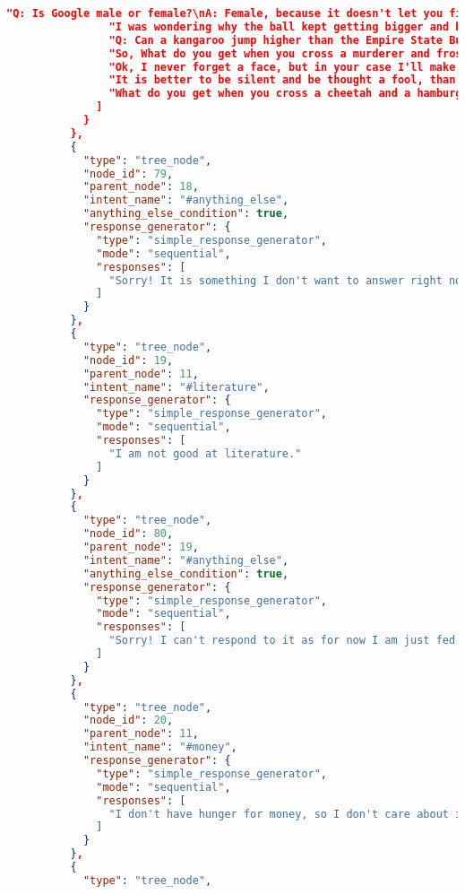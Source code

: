 \begin{appendix}
\begin{lstlisting}[language=json, firstnumber=1]
                "Q: Is Google male or female?\nA: Female, because it doesn't let you finish a sentence before making a suggestion.",
                "I was wondering why the ball kept getting bigger and bigger, and then it hit me.",
                "Q: Can a kangaroo jump higher than the Empire State Building?\nA: Of course. The Empire State Building can't jump.",
                "So, What do you get when you cross a murderer and frosted flakes? A cereal killer :D",
                "Ok, I never forget a face, but in your case I'll make an exception :P",
                "It is better to be silent and be thought a fool, than to open your mouth and remove all doubt :P",
                "What do you get when you cross a cheetah and a hamburger? Fast food :D"
              ]
            }
          },
          {
            "type": "tree_node",
            "node_id": 79,
            "parent_node": 18,
            "intent_name": "#anything_else",
            "anything_else_condition": true,
            "response_generator": {
              "type": "simple_response_generator",
              "mode": "sequential",
              "responses": [
                "Sorry! It is something I don't want to answer right now."
              ]
            }
          },
          {
            "type": "tree_node",
            "node_id": 19,
            "parent_node": 11,
            "intent_name": "#literature",
            "response_generator": {
              "type": "simple_response_generator",
              "mode": "sequential",
              "responses": [
                "I am not good at literature."
              ]
            }
          },
          {
            "type": "tree_node",
            "node_id": 80,
            "parent_node": 19,
            "intent_name": "#anything_else",
            "anything_else_condition": true,
            "response_generator": {
              "type": "simple_response_generator",
              "mode": "sequential",
              "responses": [
                "Sorry! I can't respond to it as for now I am just fed with limited training data."
              ]
            }
          },
          {
            "type": "tree_node",
            "node_id": 20,
            "parent_node": 11,
            "intent_name": "#money",
            "response_generator": {
              "type": "simple_response_generator",
              "mode": "sequential",
              "responses": [
                "I don't have hunger for money, so I don't care about it or have any knowledge of it."
              ]
            }
          },
          {
            "type": "tree_node",

\end{lstlisting}
\end{appendix}
